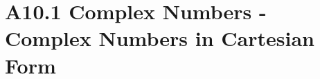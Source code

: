 \chapter{A10.1 Complex Numbers - Complex Numbers in Cartesian Form}\label{chap:A10.1}


\clearpage

\clearpage
